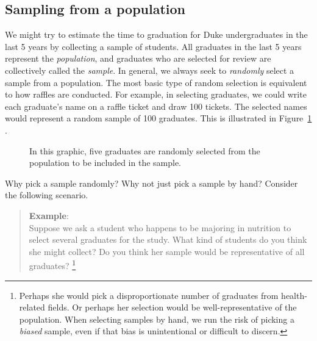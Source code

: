 \documentclass[
  letterpaper,
  DIV=11,
  numbers=noendperiod]{scrreprt}
\begin{document}
\subsection{Sampling from a
population}\label{sampling-from-a-population}

We might try to estimate the time to graduation for Duke undergraduates
in the last 5 years by collecting a sample of students. All graduates in
the last 5 years represent the \emph{population}, and graduates who are
selected for review are collectively called the \emph{sample}. In
general, we always seek to \emph{randomly} select a sample from a
population. The most basic type of random selection is equivalent to how
raffles are conducted. For example, in selecting graduates, we could
write each graduate's name on a raffle ticket and draw 100 tickets. The
selected names would represent a random sample of 100 graduates. This is
illustrated in Figure~\ref{fig-randsamp} .

\begin{figure}


\caption{\label{fig-randsamp}In this graphic, five graduates are
randomly selected from the population to be included in the sample.}

\end{figure}%

Why pick a sample randomly? Why not just pick a sample by hand? Consider
the following scenario.

\begin{quote}
\textbf{Example}:\\
Suppose we ask a student who happens to be majoring in nutrition to
select several graduates for the study. What kind of students do you
think she might collect? Do you think her sample would be representative
of all graduates? \footnote{Perhaps she would pick a disproportionate
  number of graduates from health-related fields. Or perhaps her
  selection would be well-representative of the population. When
  selecting samples by hand, we run the risk of picking a \emph{biased}
  sample, even if that bias is unintentional or difficult to discern.}
\end{quote}
\end{document}
